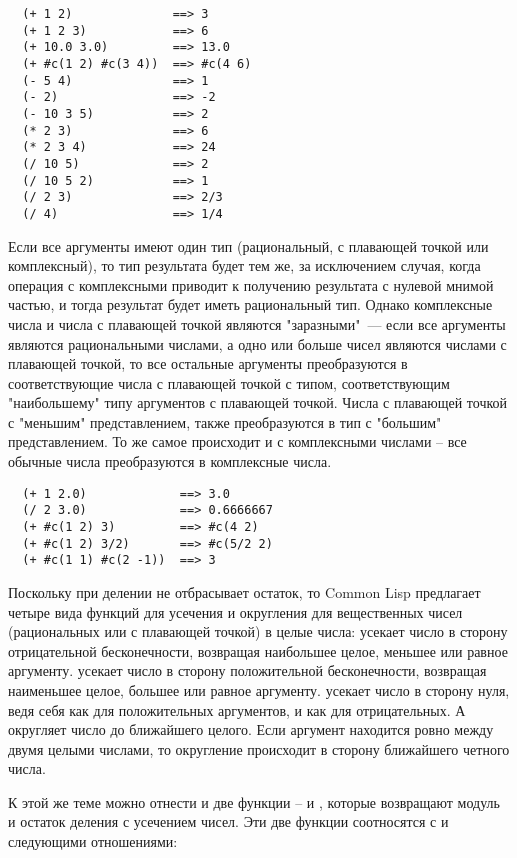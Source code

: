 \begin{verbatim}
  (+ 1 2)              ==> 3
  (+ 1 2 3)            ==> 6
  (+ 10.0 3.0)         ==> 13.0
  (+ #c(1 2) #c(3 4))  ==> #c(4 6)
  (- 5 4)              ==> 1
  (- 2)                ==> -2
  (- 10 3 5)           ==> 2
  (* 2 3)              ==> 6
  (* 2 3 4)            ==> 24
  (/ 10 5)             ==> 2
  (/ 10 5 2)           ==> 1
  (/ 2 3)              ==> 2/3
  (/ 4)                ==> 1/4
\end{verbatim}

Если все аргументы имеют один тип (рациональный, с плавающей точкой или комплексный), то
тип результата будет тем же, за исключением случая, когда операция с комплексными приводит
к получению результата с нулевой мнимой частью, и тогда результат будет иметь рациональный
тип.  Однако комплексные числа и числа с плавающей точкой являются "заразными"~--- если все
аргументы являются рациональными числами, а одно или больше чисел являются числами с
плавающей точкой, то все остальные аргументы преобразуются в соответствующие числа с
плавающей точкой с типом, соответствующим "наибольшему" типу аргументов с плавающей
точкой.  Числа с плавающей точкой с "меньшим" представлением, также преобразуются в тип с
"большим" представлением.  То же самое происходит и с комплексными числами -- все обычные
числа преобразуются в комплексные числа.

\begin{verbatim}
  (+ 1 2.0)             ==> 3.0
  (/ 2 3.0)             ==> 0.6666667
  (+ #c(1 2) 3)         ==> #c(4 2)
  (+ #c(1 2) 3/2)       ==> #c(5/2 2)
  (+ #c(1 1) #c(2 -1))  ==> 3
\end{verbatim}

Поскольку \code{/} при делении не отбрасывает остаток, то Common Lisp предлагает четыре
вида функций для усечения и округления для вещественных чисел (рациональных или с
плавающей точкой) в целые числа:  усекает число в сторону отрицательной
бесконечности, возвращая наибольшее целое, меньшее или равное аргументу. 
усекает число в сторону положительной бесконечности, возвращая наименьшее целое, большее
или равное аргументу.  усекает число в сторону нуля, ведя себя как
 для положительных аргументов, и как  для отрицательных.  А
 округляет число до ближайшего целого. Если аргумент находится ровно между
двумя целыми числами, то округление происходит в сторону ближайшего четного числа.

К этой же теме можно отнести и две функции --  и , которые возвращают
модуль и остаток деления с усечением чисел.  Эти две функции соотносятся с  и
 следующими отношениями:
  
